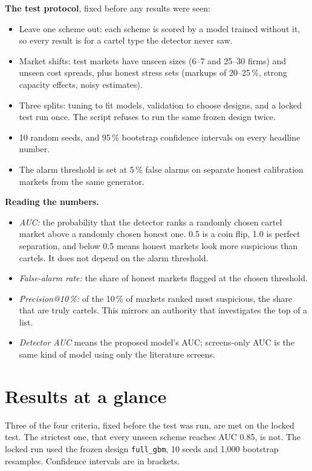 \documentclass[11pt,a4paper]{article}
\begin{document}
\textbf{The test protocol}, fixed before any results were seen:
\begin{itemize}
\item Leave one scheme out: each scheme is scored by a model trained without it, so every result is for a cartel type the detector never saw.
\item Market shifts: test markets have unseen sizes (6--7 and 25--30 firms) and unseen cost spreads, plus honest stress sets (markups of 20--25\,\%, strong capacity effects, noisy estimates).
\item Three splits: tuning to fit models, validation to choose designs, and a locked test run once. The script refuses to run the same frozen design twice.
\item 10 random seeds, and 95\,\% bootstrap confidence intervals on every headline number.
\item The alarm threshold is set at 5\,\% false alarms on separate honest calibration markets from the same generator.
\end{itemize}

\textbf{Reading the numbers.}
\begin{itemize}
\item \emph{AUC:} the probability that the detector ranks a randomly chosen cartel market above a randomly chosen honest one. 0.5 is a coin flip, 1.0 is perfect separation, and below 0.5 means honest markets look more suspicious than cartels. It does not depend on the alarm threshold.
\item \emph{False-alarm rate:} the share of honest markets flagged at the chosen threshold.
\item \emph{Precision@10\,\%:} of the 10\,\% of markets ranked most suspicious, the share that are truly cartels. This mirrors an authority that investigates the top of a list.
\item \emph{Detector AUC} means the proposed model's AUC; screens-only AUC is the same kind of model using only the literature screens.
\end{itemize}

\section{Results at a glance}

Three of the four criteria, fixed before the test was run, are met on the locked test. The strictest one, that every unseen scheme reaches AUC 0.85, is not. The locked run used the frozen design \texttt{full\_gbm}, 10 seeds and 1{,}000 bootstrap resamples. Confidence intervals are in brackets.
\end{document}
